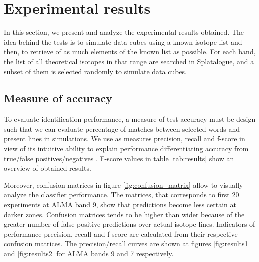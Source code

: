 \section{Experimental results} \label{sec:results}

In this section, we present and analyze the experimental results obtained.
The idea behind the tests is to simulate data cubes using a known isotope list and then, to retrieve of as much elements of the known list as possible.
For each band, the list of all theoretical isotopes in that range are searched in Splatalogue, and a subset of them is selected randomly to simulate data cubes.

\subsection{Measure of accuracy}
To evaluate identification performance, a measure of test accuracy must be design such that we can evaluate percentage of matches between selected words and present lines in simulations.
We use as measures precision, recall and f-score in view of its intuitive ability to explain performance differentiating accuracy from true/false positives/negatives \citep{precision_recall}.
F-score values in table \ref{tab:results} show an overview of obtained results.

Moreover, confusion matrices in figure \ref{fig:confusion_matrix} allow to visually analyze the classifier performance.
The matrices, that corresponds to first 20 experiments at ALMA band 9, show that predictions become less certain at darker zones.
Confusion matrices tends to be higher than wider because of the greater number of false positive predictions over actual isotope lines.
Indicators of performance precision, recall and f-score are calculated from their respective confusion matrices.
The precision/recall curves are shown at figures \ref{fig:results1} and \ref{fig:results2} for ALMA bands 9 and 7 respectively.


